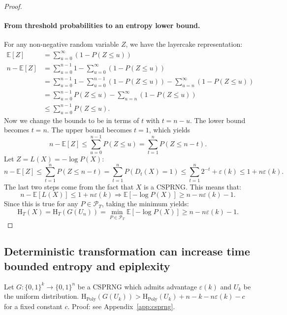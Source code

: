 \documentclass[twoside]{article}
\newcommand{\rH}{\mathrm{H}}
\begin{document}
\begin{proof}
\paragraph{From threshold probabilities to an entropy lower bound.}
For any non-negative random variable $Z$, we have the layercake representation:
\begin{align}
    \mathbb{E}[Z] &= \sum_{u=0}^\infty (1-P(Z \leq u))\\
     n-\mathbb{E}[Z] &= \sum_{u=0}^{n-1}1 -\sum_{u=0}^\infty (1-P(Z \leq u))\\
    &= \sum_{u=0}^{n-1}1 -\sum_{u=0}^{n-1} (1-P(Z \leq u))-\sum_{u=n}^\infty (1-P(Z \leq u))
    \\&= \sum_{u=0}^{n-1} P(Z \leq u)-\sum_{u=n}^\infty (1-P(Z \leq u))\\
    &\leq \sum_{u=0}^{n-1} P(Z \leq u).
\end{align}
Now we change the bounds to be in terms of $t$ with $t=n-u$. The lower bound becomes $t = n$. The upper bound becomes $t = 1$, which yields
$$n-\mathbb{E}[Z] \leq  \sum_{u=0}^{n-1} P(Z \leq u) = \sum_{t=1}^{n} P(Z \leq n-t).$$
Let $Z = L(X) = -\log P(X)$:
$$n-\mathbb{E}[Z] \leq \sum_{t=1}^{n} P(Z \leq n-t) = \sum_{t=1}^{n} P(D_t(X)=1)  \leq \sum_{t=1}^{n} 2^{-t} + \varepsilon(k)\leq 1 + n\varepsilon(k).$$
The last two steps come from the fact that $X$ is a CSPRNG. This means that:
$$n - \mathbb{E}[L(X)] \leq 1 + n\varepsilon(k) \Rightarrow \mathbb{E}[-\log P(X)]\geq n - n\varepsilon(k)-1.$$
Since this is true for any $P\in \mathcal{P}_T$, taking the minimum yields:
$$\rH_T(X) = \rH_T(G(U_n)) = \min_{P \in \mathcal{P}_T}\mathbb{E}[-\log P(X)]\geq n - n\varepsilon(k)-1.$$
\end{proof}



\subsection{Deterministic transformation can increase time bounded entropy and epiplexity}
\label{sec:epi_increase}

%
%
%

\begin{theorem}
    Let $G: \{0,1\}^k \to \{0,1\}^n$ be a $\mathrm{CSPRNG}$ which admits advantage $\varepsilon(k)$ and $U_k$ be the uniform distribution. $\rH_{\mathrm{Poly}}(G(U_k))>\rH_{\mathrm{Poly}}(U_k) + n-k-n\varepsilon(k)-c$ for a fixed constant $c$. Proof: see Appendix~\ref{app:csprng}.
\end{theorem}
\end{document}
